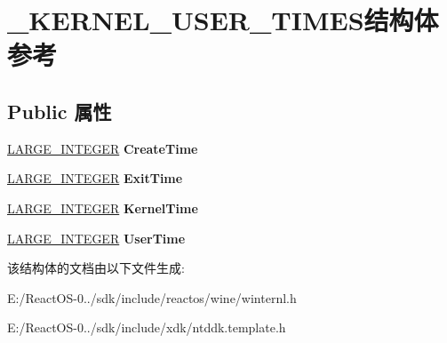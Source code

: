 \hypertarget{struct___k_e_r_n_e_l___u_s_e_r___t_i_m_e_s}{}\section{\+\_\+\+K\+E\+R\+N\+E\+L\+\_\+\+U\+S\+E\+R\+\_\+\+T\+I\+M\+E\+S结构体 参考}
\label{struct___k_e_r_n_e_l___u_s_e_r___t_i_m_e_s}
\subsection*{Public 属性}
\begin{DoxyCompactItemize}
\item 
\mbox{\label{struct___k_e_r_n_e_l___u_s_e_r___t_i_m_e_s_a77033569c0c186ea0776f08673e480cc}} 
\hyperlink{union___l_a_r_g_e___i_n_t_e_g_e_r}{L\+A\+R\+G\+E\+\_\+\+I\+N\+T\+E\+G\+ER} {\bfseries Create\+Time}
\item 
\mbox{\label{struct___k_e_r_n_e_l___u_s_e_r___t_i_m_e_s_ad315f566e9569599dc3e5469e14a03bb}} 
\hyperlink{union___l_a_r_g_e___i_n_t_e_g_e_r}{L\+A\+R\+G\+E\+\_\+\+I\+N\+T\+E\+G\+ER} {\bfseries Exit\+Time}
\item 
\mbox{\label{struct___k_e_r_n_e_l___u_s_e_r___t_i_m_e_s_aa8c125f1580fb09bbfea2aff0c8d2d4b}} 
\hyperlink{union___l_a_r_g_e___i_n_t_e_g_e_r}{L\+A\+R\+G\+E\+\_\+\+I\+N\+T\+E\+G\+ER} {\bfseries Kernel\+Time}
\item 
\mbox{\label{struct___k_e_r_n_e_l___u_s_e_r___t_i_m_e_s_a29452b83ad6015f08e32805b6b0a71c2}} 
\hyperlink{union___l_a_r_g_e___i_n_t_e_g_e_r}{L\+A\+R\+G\+E\+\_\+\+I\+N\+T\+E\+G\+ER} {\bfseries User\+Time}
\end{DoxyCompactItemize}


该结构体的文档由以下文件生成\+:\begin{DoxyCompactItemize}
\item 
E\+:/\+React\+O\+S-\/0../sdk/include/reactos/wine/winternl.\+h\item 
E\+:/\+React\+O\+S-\/0../sdk/include/xdk/ntddk.\+template.\+h\end{DoxyCompactItemize}
